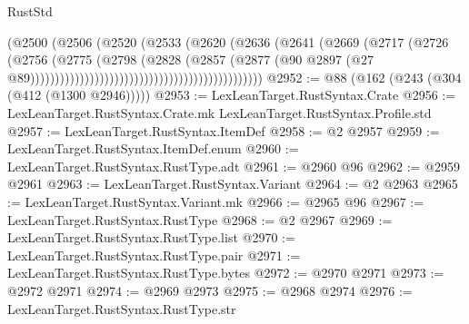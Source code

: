\begin{lexlean}{RustStd}
\begin{coremodule}
                                                              (@2500
                                                                (@2506
                                                                  (@2520
                                                                    (@2533
                                                                      (@2620
                                                                        (@2636
                                                                          (@2641
                                                                            (@2669
                                                                              (@2717
                                                                                (@2726
                                                                                  (@2756
                                                                                    (@2775
                                                                                      (@2798
                                                                                        (@2828
                                                                                          (@2857
                                                                                            (@2877
                                                                                              (@90
                                                                                                @2897
                                                                                                (@27
                                                                                                  @89)))))))))))))))))))))))))))))))))))))))))))))))
@2952 := @88 (@162 (@243 (@304 (@412 (@1300 @2946)))))
@2953 := LexLeanTarget.RustSyntax.Crate
@2956 := LexLeanTarget.RustSyntax.Crate.mk LexLeanTarget.RustSyntax.Profile.std
@2957 := LexLeanTarget.RustSyntax.ItemDef
@2958 := @2 @2957
@2959 := LexLeanTarget.RustSyntax.ItemDef.enum
@2960 := LexLeanTarget.RustSyntax.RustType.adt
@2961 := @2960 @96
@2962 := @2959 @2961
@2963 := LexLeanTarget.RustSyntax.Variant
@2964 := @2 @2963
@2965 := LexLeanTarget.RustSyntax.Variant.mk
@2966 := @2965 @96
@2967 := LexLeanTarget.RustSyntax.RustType
@2968 := @2 @2967
@2969 := LexLeanTarget.RustSyntax.RustType.list
@2970 := LexLeanTarget.RustSyntax.RustType.pair
@2971 := LexLeanTarget.RustSyntax.RustType.bytes
@2972 := @2970 @2971
@2973 := @2972 @2971
@2974 := @2969 @2973
@2975 := @2968 @2974
@2976 := LexLeanTarget.RustSyntax.RustType.str

\end{coremodule}
\end{lexlean}
